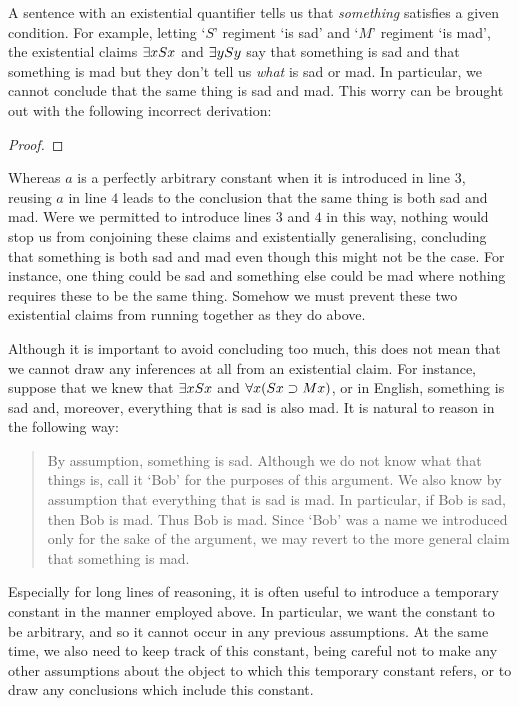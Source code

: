 A sentence with an existential quantifier tells us that \textit{something} satisfies a given condition.
For example, letting `$S$' regiment `is sad' and `$M$' regiment `is mad', the existential claims $\exists x Sx$ and $\exists y Sy$ say that something is sad and that something is mad but they don't tell us \textit{what} is sad or mad.
In particular, we cannot conclude that the same thing is sad and mad.
This worry can be brought out with the following incorrect derivation:

\begin{proof}
   \pr{}
	 \pr{}
    
   
   
   
\end{proof}

Whereas $a$ is a perfectly arbitrary constant when it is introduced in line $3$, reusing $a$ in line $4$ leads to the conclusion that the same thing is both sad and mad.
Were we permitted to introduce lines $3$ and $4$ in this way, nothing would stop us from conjoining these claims and existentially generalising, concluding that something is both sad and mad even though this might not be the case.
For instance, one thing could be sad and something else could be mad where nothing requires these to be the same thing. 
Somehow we must prevent these two existential claims from running together as they do above.

Although it is important to avoid concluding too much, this does not mean that we cannot draw any inferences at all from an existential claim.
For instance, suppose that we knew that $\exists x Sx$ and $\forall x(Sx \supset Mx)$, or in English, something is sad and, moreover, everything that is sad is also mad.
It is natural to reason in the following way:

\begin{quote}
  By assumption, something is sad.
  Although we do not know what that things is, call it `Bob' for the purposes of this argument.
  We also know by assumption that everything that is sad is mad.
  In particular, if Bob is sad, then Bob is mad.
  Thus Bob is mad.
  Since `Bob' was a name we introduced only for the sake of the argument, we may revert to the more general claim that something is mad.
\end{quote}

Especially for long lines of reasoning, it is often useful to introduce a temporary constant in the manner employed above.
In particular, we want the constant to be arbitrary, and so it cannot occur in any previous assumptions.
At the same time, we also need to keep track of this constant, being careful not to make any other assumptions about the object to which this temporary constant refers, or to draw any conclusions which include this constant.


